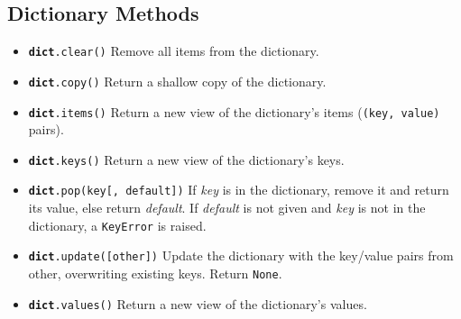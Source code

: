 \subsection{Dictionary Methods}
\begin{itemize}
\item \colorbox{CornflowerBlue!20}{\texttt{\textbf{dict}.clear()}} Remove all items from the dictionary.
\item \colorbox{CornflowerBlue!20}{\texttt{\textbf{dict}.copy()}} Return a shallow copy of the dictionary.
\item \colorbox{CornflowerBlue!20}{\texttt{\textbf{dict}.items()}} Return a new view of the dictionary’s items 
(\colorbox{CornflowerBlue!20}{\texttt{(key, value)}} pairs).
\item \colorbox{CornflowerBlue!20}{\texttt{\textbf{dict}.keys()}} Return a new view of the dictionary’s keys.
\item \colorbox{CornflowerBlue!20}{\texttt{\textbf{dict}.pop(key[, default])}} If \textit{key} is in the dictionary, remove it and return its value,
else return \textit{default}. If \textit{default} is not given and \textit{key} is not in the dictionary, a 
\colorbox{CornflowerBlue!20}{\texttt{KeyError}}
is raised.
\item \colorbox{CornflowerBlue!20}{\texttt{\textbf{dict}.update([other])}} Update the dictionary with the key/value pairs from other,
overwriting existing keys. Return \colorbox{CornflowerBlue!20}{\texttt{None}}.
\item \colorbox{CornflowerBlue!20}{\texttt{\textbf{dict}.values()}} Return a new view of the dictionary’s values.
\end{itemize}
